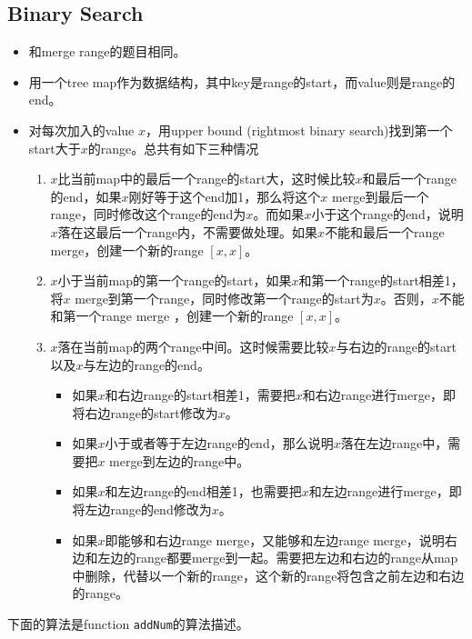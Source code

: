 \subsection{Binary Search}
\begin{itemize}
\item 和merge range的题目相同。
\item 用一个tree map作为数据结构，其中key是range的start，而value则是range的end。
\item 对每次加入的value $x$，用upper bound (rightmost binary search)找到第一个start大于$ x $的range。总共有如下三种情况
\begin{enumerate}
\item $x$比当前map中的最后一个range的start大，这时候比较$x$和最后一个range的end，如果$x$刚好等于这个end加1，那么将这个$x$ merge到最后一个range，同时修改这个range的end为$x$。而如果$x$小于这个range的end，说明$x$落在这最后一个range内，不需要做处理。如果$x$不能和最后一个range merge，创建一个新的range $[x,x]$。
\item $x$小于当前map的第一个range的start，如果$x$和第一个range的start相差1，将$x$ merge到第一个range，同时修改第一个range的start为$x$。否则，$ x $不能和第一个range merge
，创建一个新的range $[x,x]$。
\item $x$落在当前map的两个range中间。这时候需要比较$x$与右边的range的start以及$x$与左边的range的end。
\begin{itemize}
\item 如果$x$和右边range的start相差1，需要把$x$和右边range进行merge，即将右边range的start修改为$x$。
\item 如果$x$小于或者等于左边range的end，那么说明$x$落在左边range中，需要把$x$ merge到左边的range中。
\item 如果$x$和左边range的end相差1，也需要把$x$和左边range进行merge，即将左边range的end修改为$x$。
\item 如果$x$即能够和右边range merge，又能够和左边range merge，说明右边和左边的range都要merge到一起。需要把左边和右边的range从map中删除，代替以一个新的range，这个新的range将包含之前左边和右边的range。
\end{itemize}
\end{enumerate}
\end{itemize}
下面的算法是function \texttt{addNum}的算法描述。
\setcounter{algorithm}{0}
